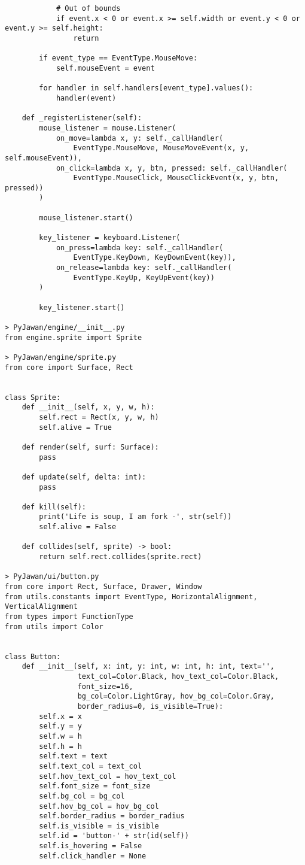 \documentclass[11pt]{article}
\begin{document}
\begin{lstlisting}
            # Out of bounds
            if event.x < 0 or event.x >= self.width or event.y < 0 or event.y >= self.height:
                return

        if event_type == EventType.MouseMove:
            self.mouseEvent = event

        for handler in self.handlers[event_type].values():
            handler(event)

    def _registerListener(self):
        mouse_listener = mouse.Listener(
            on_move=lambda x, y: self._callHandler(
                EventType.MouseMove, MouseMoveEvent(x, y, self.mouseEvent)),
            on_click=lambda x, y, btn, pressed: self._callHandler(
                EventType.MouseClick, MouseClickEvent(x, y, btn, pressed))
        )

        mouse_listener.start()

        key_listener = keyboard.Listener(
            on_press=lambda key: self._callHandler(
                EventType.KeyDown, KeyDownEvent(key)),
            on_release=lambda key: self._callHandler(
                EventType.KeyUp, KeyUpEvent(key))
        )

        key_listener.start()

> PyJawan/engine/__init__.py
from engine.sprite import Sprite

> PyJawan/engine/sprite.py
from core import Surface, Rect


class Sprite:
    def __init__(self, x, y, w, h):
        self.rect = Rect(x, y, w, h)
        self.alive = True

    def render(self, surf: Surface):
        pass

    def update(self, delta: int):
        pass

    def kill(self):
        print('Life is soup, I am fork -', str(self))
        self.alive = False

    def collides(self, sprite) -> bool:
        return self.rect.collides(sprite.rect)

> PyJawan/ui/button.py
from core import Rect, Surface, Drawer, Window
from utils.constants import EventType, HorizontalAlignment, VerticalAlignment
from types import FunctionType
from utils import Color


class Button:
    def __init__(self, x: int, y: int, w: int, h: int, text='',
                 text_col=Color.Black, hov_text_col=Color.Black,
                 font_size=16,
                 bg_col=Color.LightGray, hov_bg_col=Color.Gray,
                 border_radius=0, is_visible=True):
        self.x = x
        self.y = y
        self.w = h
        self.h = h
        self.text = text
        self.text_col = text_col
        self.hov_text_col = hov_text_col
        self.font_size = font_size
        self.bg_col = bg_col
        self.hov_bg_col = hov_bg_col
        self.border_radius = border_radius
        self.is_visible = is_visible
        self.id = 'button-' + str(id(self))
        self.is_hovering = False
        self.click_handler = None


\end{lstlisting}
\end{document}
